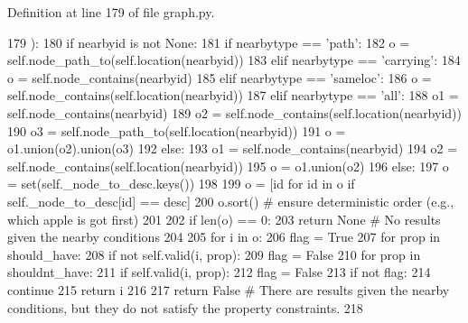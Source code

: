 Definition at line 179 of file graph.\+py.


\begin{DoxyCode}
179     ):
180         \textcolor{keywordflow}{if} nearbyid \textcolor{keywordflow}{is} \textcolor{keywordflow}{not} \textcolor{keywordtype}{None}:
181             \textcolor{keywordflow}{if} nearbytype == \textcolor{stringliteral}{'path'}:
182                 o = self.node\_path\_to(self.location(nearbyid))
183             \textcolor{keywordflow}{elif} nearbytype == \textcolor{stringliteral}{'carrying'}:
184                 o = self.node\_contains(nearbyid)
185             \textcolor{keywordflow}{elif} nearbytype == \textcolor{stringliteral}{'sameloc'}:
186                 o = self.node\_contains(self.location(nearbyid))
187             \textcolor{keywordflow}{elif} nearbytype == \textcolor{stringliteral}{'all'}:
188                 o1 = self.node\_contains(nearbyid)
189                 o2 = self.node\_contains(self.location(nearbyid))
190                 o3 = self.node\_path\_to(self.location(nearbyid))
191                 o = o1.union(o2).union(o3)
192             \textcolor{keywordflow}{else}:
193                 o1 = self.node\_contains(nearbyid)
194                 o2 = self.node\_contains(self.location(nearbyid))
195                 o = o1.union(o2)
196         \textcolor{keywordflow}{else}:
197             o = set(self.\_node\_to\_desc.keys())
198 
199         o = [id \textcolor{keywordflow}{for} id \textcolor{keywordflow}{in} o \textcolor{keywordflow}{if} self.\_node\_to\_desc[id] == desc]
200         o.sort()  \textcolor{comment}{# ensure deterministic order (e.g., which apple is got first)}
201 
202         \textcolor{keywordflow}{if} len(o) == 0:
203             \textcolor{keywordflow}{return} \textcolor{keywordtype}{None}  \textcolor{comment}{# No results given the nearby conditions}
204 
205         \textcolor{keywordflow}{for} i \textcolor{keywordflow}{in} o:
206             flag = \textcolor{keyword}{True}
207             \textcolor{keywordflow}{for} prop \textcolor{keywordflow}{in} should\_have:
208                 \textcolor{keywordflow}{if} \textcolor{keywordflow}{not} self.valid(i, prop):
209                     flag = \textcolor{keyword}{False}
210             \textcolor{keywordflow}{for} prop \textcolor{keywordflow}{in} shouldnt\_have:
211                 \textcolor{keywordflow}{if} self.valid(i, prop):
212                     flag = \textcolor{keyword}{False}
213             \textcolor{keywordflow}{if} \textcolor{keywordflow}{not} flag:
214                 \textcolor{keywordflow}{continue}
215             \textcolor{keywordflow}{return} i
216 
217         \textcolor{keywordflow}{return} \textcolor{keyword}{False}  \textcolor{comment}{# There are results given the nearby conditions, but they do not satisfy the property
       constraints.}
218 
\end{DoxyCode}
